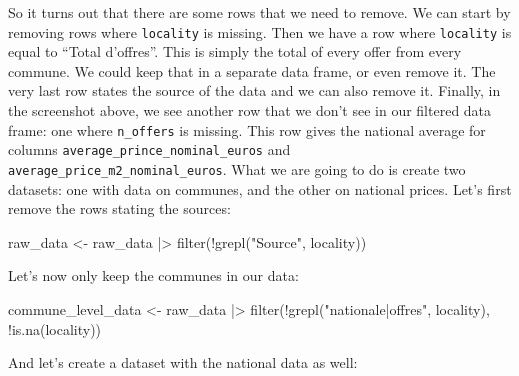 \documentclass[
  letterpaper,
  DIV=11,
  numbers=noendperiod]{scrartcl}
\newenvironment{Shaded}{\begin{snugshade}}{\end{snugshade}}
\newcommand{\FunctionTok}[1]{\textcolor[rgb]{0.28,0.35,0.67}{#1}}
\newcommand{\NormalTok}[1]{\textcolor[rgb]{0.00,0.23,0.31}{#1}}
\newcommand{\OtherTok}[1]{\textcolor[rgb]{0.00,0.23,0.31}{#1}}
\newcommand{\SpecialCharTok}[1]{\textcolor[rgb]{0.37,0.37,0.37}{#1}}
\newcommand{\StringTok}[1]{\textcolor[rgb]{0.13,0.47,0.30}{#1}}
\begin{document}
So it turns out that there are some rows that we need to remove. We can
start by removing rows where \texttt{locality} is missing. Then we have
a row where \texttt{locality} is equal to ``Total d'offres''. This is
simply the total of every offer from every commune. We could keep that
in a separate data frame, or even remove it. The very last row states
the source of the data and we can also remove it. Finally, in the
screenshot above, we see another row that we don't see in our filtered
data frame: one where \texttt{n\_offers} is missing. This row gives the
national average for columns \texttt{average\_prince\_nominal\_euros}
and \texttt{average\_price\_m2\_nominal\_euros}. What we are going to do
is create two datasets: one with data on communes, and the other on
national prices. Let's first remove the rows stating the sources:

\begin{Shaded}
\begin{Highlighting}[]
\NormalTok{raw\_data }\OtherTok{\textless{}{-}}\NormalTok{ raw\_data }\SpecialCharTok{|\textgreater{}}
  \FunctionTok{filter}\NormalTok{(}\SpecialCharTok{!}\FunctionTok{grepl}\NormalTok{(}\StringTok{"Source"}\NormalTok{, locality))}
\end{Highlighting}
\end{Shaded}

Let's now only keep the communes in our data:

\begin{Shaded}
\begin{Highlighting}[]
\NormalTok{commune\_level\_data }\OtherTok{\textless{}{-}}\NormalTok{ raw\_data }\SpecialCharTok{|\textgreater{}}
    \FunctionTok{filter}\NormalTok{(}\SpecialCharTok{!}\FunctionTok{grepl}\NormalTok{(}\StringTok{"nationale|offres"}\NormalTok{, locality),}
           \SpecialCharTok{!}\FunctionTok{is.na}\NormalTok{(locality))}
\end{Highlighting}
\end{Shaded}

And let's create a dataset with the national data as well:
\end{document}
